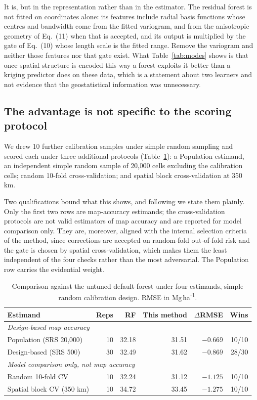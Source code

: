 \documentclass[preprint,12pt,authoryear]{elsarticle}
\newcommand{\Mgha}{Mg\,ha\textsuperscript{-1}}
\begin{document}
It is, but in the representation rather than in the estimator. The residual
forest is not fitted on coordinates alone: its features include radial basis
functions whose centres and bandwidth come from the fitted variogram, and from
the anisotropic geometry of Eq.~(11) when that is accepted, and its output is
multiplied by the gate of Eq.~(10) whose length scale is the fitted range.
Remove the variogram and neither those features nor that gate exist. What
Table~\ref{tab:modes} shows is that once spatial structure is encoded this way a
forest exploits it better than a kriging predictor does on these data, which is
a statement about two learners and not evidence that the geostatistical
information was unnecessary.

\subsection{The advantage is not specific to the scoring protocol}

We drew 10 further calibration samples under simple random sampling and scored
each under three additional protocols (Table~\ref{tab:estimands}): a Population
estimand, an independent simple random sample of 20{,}000 cells excluding the
calibration cells; random 10-fold cross-validation; and spatial block
cross-validation at 350 km.

Two qualifications bound what this shows, and following \citet{wadoux2021} we
state them plainly. Only the first two rows are map-accuracy estimands; the
cross-validation protocols are not valid estimators of map accuracy and are
reported for model comparison only. They are, moreover, aligned with the
internal selection criteria of the method, since corrections are accepted on
random-fold out-of-fold risk and the gate is chosen by spatial
cross-validation, which makes them the least independent of the four checks
rather than the most adversarial. The Population row carries the evidential
weight.

\begin{table}[!ht]
\centering
\caption{Comparison against the untuned default forest under four estimands,
simple random calibration design. RMSE in \Mgha{}.}
\label{tab:estimands}
\small
\begin{tabular}{lrrrrr}
\toprule
Estimand & Reps & RF & This method & $\Delta$RMSE & Wins \\
\midrule
\multicolumn{6}{l}{\emph{Design-based map accuracy}} \\
Population (SRS 20{,}000) & 10 & 32.18 & 31.51 & $-0.669$ & 10/10 \\
Design-based (SRS 500)    & 30 & 32.49 & 31.62 & $-0.869$ & 28/30 \\
\midrule
\multicolumn{6}{l}{\emph{Model comparison only, not map accuracy}} \\
Random 10-fold CV         & 10 & 32.24 & 31.12 & $-1.125$ & 10/10 \\
Spatial block CV (350 km) & 10 & 34.72 & 33.45 & $-1.275$ & 10/10 \\
\bottomrule
\end{tabular}
\end{table}
\end{document}
